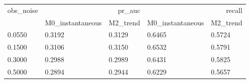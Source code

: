 \begin{tabular}{lllll}
\toprule
obs\_noise & \multicolumn{2}{r}{pr\_auc} & \multicolumn{2}{r}{recall} \\
 & M0\_instantaneous & M2\_trend & M0\_instantaneous & M2\_trend \\
\midrule
0.0550 & 0.3192 & 0.3129 & 0.6465 & 0.5724 \\
0.1500 & 0.3106 & 0.3150 & 0.6532 & 0.5791 \\
0.3000 & 0.2988 & 0.2989 & 0.6431 & 0.5825 \\
0.5000 & 0.2894 & 0.2944 & 0.6229 & 0.5657 \\
\bottomrule
\end{tabular}
